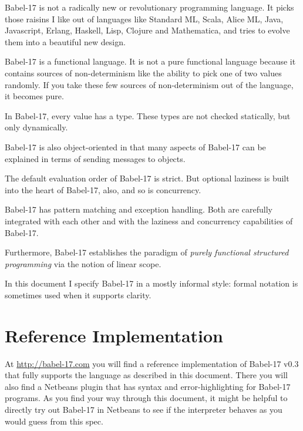 \documentclass[11pt]{amsart}
\begin{document}
Babel-17 is not a radically new or revolutionary programming language. It picks those raisins I like out of languages like Standard ML, Scala, Alice ML, Java, Javascript, Erlang, Haskell, Lisp, Clojure and Mathematica, and tries to evolve them into a beautiful new design. 

Babel-17 is a functional language. It is not a pure functional language because it contains sources of non-determinism like the ability to pick one of two values randomly. If you take these few sources of non-determinism out of the language, it becomes pure. 

In Babel-17, every value has a type. These types are not checked statically, but only dynamically. 

Babel-17 is also object-oriented in that many aspects of Babel-17 can be explained in terms of sending messages to objects. 

The default evaluation order of Babel-17 is strict. But optional laziness is built into the heart of Babel-17, also, and so is concurrency. 

Babel-17 has pattern matching and exception handling. Both are carefully integrated with each other and with the laziness and concurrency capabilities of Babel-17.

Furthermore, Babel-17 establishes the paradigm of \emph{purely functional structured programming}  via the notion of linear scope.

In this document  I specify Babel-17 in a mostly informal style: formal notation is sometimes used when it supports clarity.

\section{Reference Implementation}

At \url{http://babel-17.com} you will find a reference implementation of Babel-17 v0.3 that fully supports the language as described in this document. There you will also find a Netbeans plugin that has syntax and error-highlighting for Babel-17 programs. As you find your way through this document, it might be helpful to directly try out Babel-17 in Netbeans to see if the interpreter behaves as you would guess from this spec. 
\end{document}
